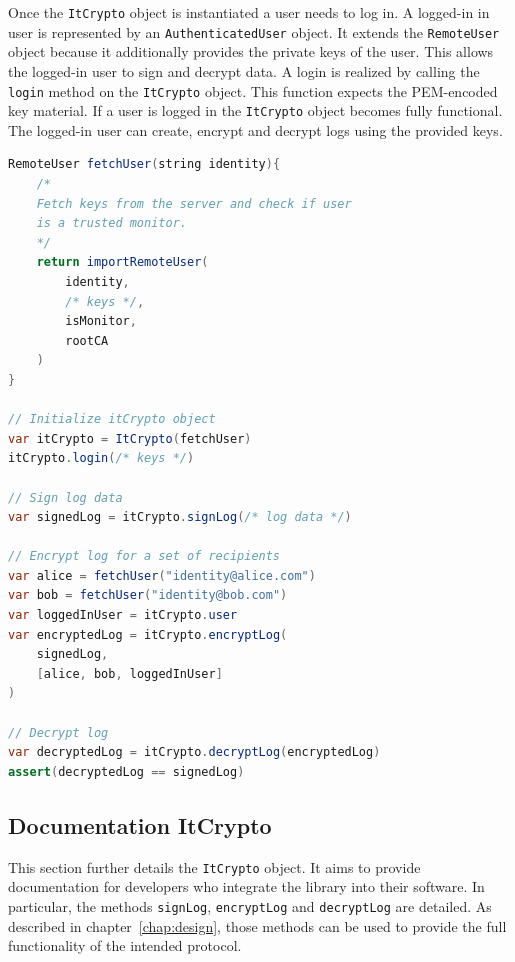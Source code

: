\documentclass[../main.tex]{subfiles}
\begin{document}
Once the \verb|ItCrypto| object is instantiated a user needs to log in.
A logged-in in user is represented by an \verb|AuthenticatedUser| object.
It extends the \verb|RemoteUser| object because it additionally provides the private keys of the user.
This allows the logged-in user to sign and decrypt data.
A login is realized by calling the \verb|login| method on the \verb|ItCrypto| object.
This function expects the PEM-encoded key material.
If a user is logged in the \verb|ItCrypto| object becomes fully functional.
The logged-in user can create, encrypt and decrypt logs using the provided keys.

\begin{lstlisting}[basicstyle=\small, label=lst:pseudocode,float,floatplacement=tbp, language=Java, caption={[Pseudocode library usage]Pseudocode of creating, encrypting and decrypting logs using the provided libraries.}, morekeywords={RemoteUser, var, assert}, commentstyle=\color{codegreen}]
RemoteUser fetchUser(string identity){
    /*
    Fetch keys from the server and check if user 
    is a trusted monitor.
    */
    return importRemoteUser(
        identity,
        /* keys */, 
        isMonitor, 
        rootCA
    )
}

// Initialize itCrypto object
var itCrypto = ItCrypto(fetchUser)
itCrypto.login(/* keys */)

// Sign log data
var signedLog = itCrypto.signLog(/* log data */)

// Encrypt log for a set of recipients
var alice = fetchUser("identity@alice.com")
var bob = fetchUser("identity@bob.com")
var loggedInUser = itCrypto.user
var encryptedLog = itCrypto.encryptLog(
    signedLog, 
    [alice, bob, loggedInUser]
)

// Decrypt log
var decryptedLog = itCrypto.decryptLog(encryptedLog)
assert(decryptedLog == signedLog)
\end{lstlisting}

\subsection{Documentation ItCrypto}
This section further details the \verb|ItCrypto| object.
It aims to provide documentation for developers who integrate the library into their software.
In particular, the methods \verb|signLog|, \verb|encryptLog| and \verb|decryptLog| are detailed.
As described in chapter~\ref{chap:design}, those methods can be used to provide the full functionality of the intended protocol.
\end{document}
